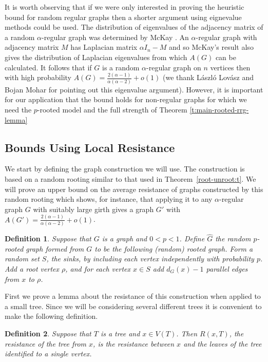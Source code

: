 \documentclass[11pt]{article}
\newtheorem*{defn}{Definition}
\theoremstyle{remark}
\def\a{\alpha}
\begin{document}
It is worth observing that if we were only interested in proving the heuristic bound for random regular graphs then a shorter argument using eignevalue methods could be used. The distribution of eigenvalues of the adjacency matrix of a random $\a$-regular graph was determined by McKay \cite{MCKAY1981203}. An $\a$-regular graph with adjacency matrix $M$ has Laplacian matrix $\alpha I_n-M$ and so McKay's result also gives the distribution of Laplacian eigenvalues from which $A(G)$ can be calculated. It follows that if $G$ is a random $\a$-regular graph on $n$ vertices then with high probability $A(G)=\frac{2(\alpha-1)}{\alpha(\alpha-2)}+o(1)$ (we thank L\'aszl\'o Lov\'asz and Bojan Mohar for pointing out this eigenvalue argument). However, it is important for our application that the bound holds for non-regular graphs for which we need the $p$-rooted model and the full strength of Theorem \ref{t:main-rooted-rrg-lemma}

\subsection{Bounds Using Local Resistance}\label{s:regular}

We start by defining the graph construction we will use. The construction is based on a random rooting similar
to that used in Theorem~\ref{root-unroot:t}. We will prove an upper bound on the average resistance of graphs constructed by this random rooting which shows, for instance, that applying it to any $\a$-regular graph $G$ with suitably large girth gives a graph $G'$ with $A(G')=\frac{2(\a-1)}{\a(\a-2)}+o(1)$.
\begin{defn}
  Suppose that $G$ is a graph and $0<p <1$. Define $\widehat G$ \emph{
    the random $p$-rooted graph formed from $G$} to be the following
  (random) rooted graph.  Form a random set $S$, the \emph{sinks}, by
  including each vertex independently with probability $p$.  Add a root
  vertex $\rho$, and for each vertex $x\in S$ add $d_G(x)-1$ parallel
  edges from $x$ to $\rho$.
\end{defn}

First we prove a lemma about the resistance of this construction when
applied to a small tree. Since we will be considering several
different trees it is convenient to make the following definition.
\begin{defn}
  Suppose that $T$ is a tree and $x\in V(T)$. Then $R(x,T)$,
  \emph{the resistance of the tree from $x$}, is the resistance between 
  $x$ and the leaves of the tree identified to a single vertex.
\end{defn}
\end{document}
